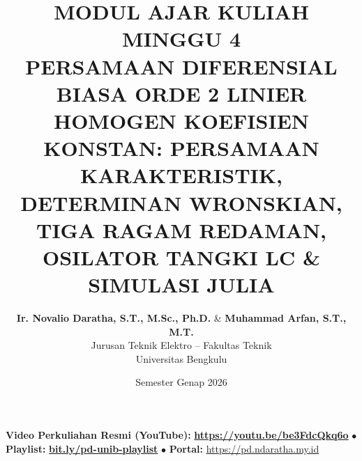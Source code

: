 \documentclass[11pt,a4paper]{article}
\title{\textbf{\Large MODUL AJAR KULIAH MINGGU 4}\\[0.3cm]
\textbf{\LARGE PERSAMAAN DIFERENSIAL BIASA ORDE 2 LINIER HOMOGEN KOEFISIEN KONSTAN: PERSAMAAN KARAKTERISTIK, DETERMINAN WRONSKIAN, TIGA RAGAM REDAMAN, OSILATOR TANGKI LC \& SIMULASI JULIA}}
\author{\textbf{Ir. Novalio Daratha, S.T., M.Sc., Ph.D.} \& \textbf{Muhammad Arfan, S.T., M.T.} \\ 
Jurusan Teknik Elektro -- Fakultas Teknik \\ 
Universitas Bengkulu}
\date{Semester Genap 2026}
\theoremstyle{definition}
\begin{document}
\maketitle
\begin{center}
  \vspace{-0.25cm}
  \begin{tcolorbox}[colback=red!4!white,colframe=red!75!black,boxrule=0.5pt,arc=2pt,left=6pt,right=6pt,top=3pt,bottom=3pt,width=0.98\textwidth]
    \centering\footnotesize
    \textbf{Video Perkuliahan Resmi (YouTube):} {\color{red!80!black}\textbf{\url{https://youtu.be/be3FdcQkq6o}}} \quad $\bullet$ \quad \textbf{Playlist:} \href{https://www.youtube.com/playlist?list=PLS5oOZWXZeTw}{\color{blue!80!black}\textbf{bit.ly/pd-unib-playlist}} \quad $\bullet$ \quad \textbf{Portal:} \url{https://pd.ndaratha.my.id}
  \end{tcolorbox}
  \vspace{-0.15cm}
\end{center}
\end{document}
